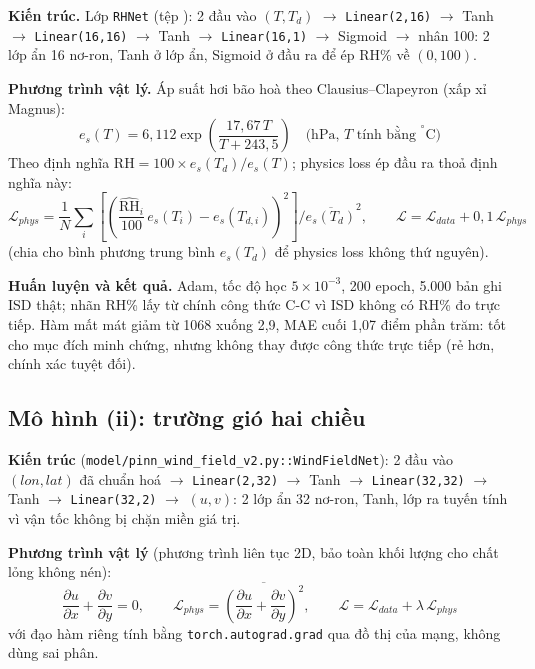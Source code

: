 \documentclass[12pt,a4paper]{report}
\begin{document}
\begin{sloppypar}
\textbf{Kiến trúc.} Lớp \texttt{RHNet} (tệp ): 2 đầu vào
$(T, T_d)$ $\to$ \texttt{Linear(2,16)} $\to$ Tanh $\to$ \texttt{Linear(16,16)} $\to$ Tanh $\to$
\texttt{Linear(16,1)} $\to$ Sigmoid $\to$ nhân 100: 2 lớp ẩn 16 nơ-ron, Tanh ở lớp ẩn, Sigmoid ở đầu ra
để ép RH\% về $(0,100)$.
\end{sloppypar}

\textbf{Phương trình vật lý.} Áp suất hơi bão hoà theo Clausius--Clapeyron (xấp xỉ Magnus):
\begin{equation}
e_s(T) = 6{,}112 \exp\!\left(\frac{17{,}67\,T}{T + 243{,}5}\right) \quad \text{(hPa, } T \text{ tính bằng } ^\circ\text{C)}
\end{equation}
Theo định nghĩa $\mathrm{RH} = 100 \times e_s(T_d)/e_s(T)$; physics loss ép đầu ra thoả định nghĩa này:
\begin{equation}
\mathcal{L}_{phys} = \frac{1}{N}\sum_i \left[\left(\frac{\widehat{\mathrm{RH}}_i}{100}\, e_s(T_i) - e_s(T_{d,i})\right)^2\right] \Big/ \overline{e_s(T_d)}^2, \qquad
\mathcal{L} = \mathcal{L}_{data} + 0{,}1\,\mathcal{L}_{phys}
\end{equation}
(chia cho bình phương trung bình $e_s(T_d)$ để physics loss không thứ nguyên).

\textbf{Huấn luyện và kết quả.} Adam, tốc độ học $5\times10^{-3}$, 200 epoch, 5.000 bản ghi ISD thật;
nhãn RH\% lấy từ chính công thức C-C vì ISD không có RH\% đo trực tiếp. Hàm mất mát giảm từ 1068 xuống
2,9, MAE cuối 1,07 điểm phần trăm: tốt cho mục đích minh chứng, nhưng không thay được công thức trực
tiếp (rẻ hơn, chính xác tuyệt đối).

\subsection{Mô hình (ii): trường gió hai chiều}

\textbf{Kiến trúc} (\texttt{model/pinn\_wind\_field\_v2.py::WindFieldNet}): 2 đầu vào $(lon, lat)$ đã
chuẩn hoá $\to$ \texttt{Linear(2,32)} $\to$ Tanh $\to$ \texttt{Linear(32,32)} $\to$ Tanh $\to$
\texttt{Linear(32,2)} $\to$ $(u,v)$: 2 lớp ẩn 32 nơ-ron, Tanh, lớp ra tuyến tính vì vận tốc không bị
chặn miền giá trị.

\textbf{Phương trình vật lý} (phương trình liên tục 2D, bảo toàn khối lượng cho chất lỏng không nén):
\begin{equation}
\frac{\partial u}{\partial x} + \frac{\partial v}{\partial y} = 0,
\qquad
\mathcal{L}_{phys} = \overline{\left(\frac{\partial u}{\partial x} + \frac{\partial v}{\partial y}\right)^{2}},
\qquad
\mathcal{L} = \mathcal{L}_{data} + \lambda\,\mathcal{L}_{phys}
\end{equation}
với đạo hàm riêng tính bằng \texttt{torch.autograd.grad} qua đồ thị của mạng, không dùng sai phân.
\end{document}
